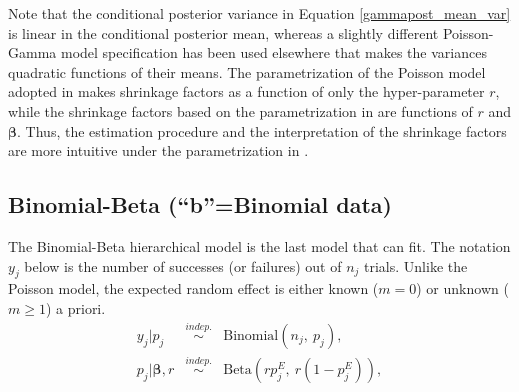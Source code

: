 \documentclass[article]{jss}
\begin{document}
Note that the conditional posterior variance in Equation \ref{gammapost_mean_var} is linear in the conditional posterior mean, whereas a slightly different Poisson-Gamma model specification has been used elsewhere \citep{morris1997} that makes the variances  quadratic functions of their means. The parametrization of the Poisson model adopted in  makes shrinkage factors as a function of only the hyper-parameter $r$, while the shrinkage factors based on the parametrization in \cite{morris1997} are functions of $r$ and $\boldsymbol{\beta}$. Thus, the estimation procedure and the interpretation of the shrinkage factors are more intuitive under the parametrization in .

\subsection[Binomial-Beta]{Binomial-Beta (``b''=Binomial data)}
The Binomial-Beta hierarchical model is the last model that  can fit. The notation $y_{j}$ below is the number of successes (or failures) out of $n_{j}$ trials. Unlike the Poisson model, the expected random effect is either known ($m=0$) or unknown ($m\ge1$) a priori.
\begin{eqnarray}
y_{j} \vert p_{j} &\stackrel{indep.}{\sim}& \textrm{Binomial}(n_{j}, ~p_{j}),\\
p_{j} \vert \boldsymbol{\beta}, r &\stackrel{indep.}{\sim}&\textrm{Beta}(rp^E_j,~ r(1-p^E_j)),
\end{eqnarray}
\end{document}
